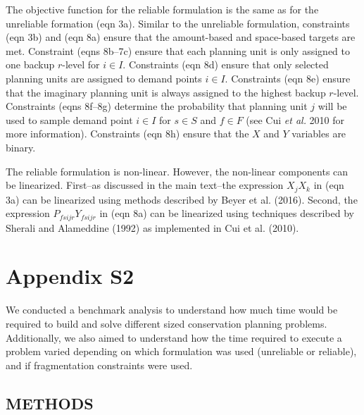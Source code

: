 \documentclass[11pt,]{article}
\begin{document}
The objective function for the reliable formulation is the same as for
the unreliable formation (eqn 3a). Similar to the unreliable
formulation, constraints (eqn 3b) and (eqn 8a) ensure that the
amount-based and space-based targets are met. Constraint (eqns 8b--7c)
ensure that each planning unit is only assigned to one backup
\(r\)-level for \(i \in I\). Constraints (eqn 8d) ensure that only
selected planning units are assigned to demand points \(i \in I\).
Constraints (eqn 8e) ensure that the imaginary planning unit is always
assigned to the highest backup \(r\)-level. Constraints (eqns 8f--8g)
determine the probability that planning unit \(j\) will be used to
sample demand point \(i \in I\) for \(s \in S\) and \(f \in F\) (see Cui
\emph{et al.} 2010 for more information). Constraints (eqn 8h) ensure
that the \(X\) and \(Y\) variables are binary.

The reliable formulation is non-linear. However, the non-linear
components can be linearized. First--as discussed in the main text--the
expression \(X_j X_k\) in (eqn 3a) can be linearized using methods
described by Beyer et al. (2016). Second, the expression
\(P_{fsijr} Y_{fsijr}\) in (eqn 8a) can be linearized using techniques
described by Sherali and Alameddine (1992) as implemented in Cui et al.
(2010).

\section{Appendix S2}\label{appendix-s2}

We conducted a benchmark analysis to understand how much time would be
required to build and solve different sized conservation planning
problems. Additionally, we also aimed to understand how the time
required to execute a problem varied depending on which formulation was
used (unreliable or reliable), and if fragmentation constraints were
used.

\subsection{METHODS}\label{methods}
\end{document}
